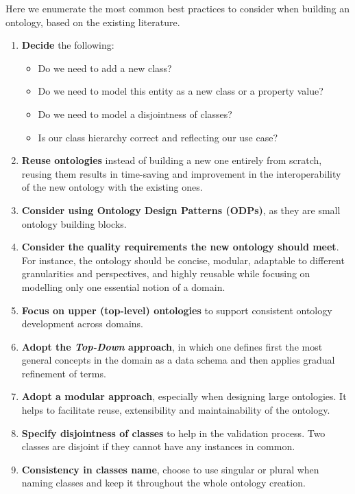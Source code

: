 \documentclass{guideline/sty/rapport}
\begin{document}
Here we enumerate the most common best practices to consider when building an ontology, based on the existing literature. \singlespacing

\begin{enumerate}
\item \textbf{Decide} the following:
    \begin{itemize}
        \item Do we need to add a new class? 
        \item Do we need to model this entity as a new class or a property value?
        \item Do we need to model a disjointness of classes? 
        \item Is our class hierarchy correct and reflecting our use case? \label{item:classhierarchy}
    \end{itemize}
    \item \textbf{Reuse ontologies} instead of building a new one entirely from scratch, reusing them results in time-saving and improvement in the interoperability of the new ontology with the existing ones. \label{item:reuse}
    \item \textbf{Consider using Ontology Design Patterns (\ac{ODPs})}, as they are small ontology building blocks. \label{item:useodp}
    \item \textbf{Consider the quality requirements the new ontology should meet}. For instance, the ontology should be concise, modular, adaptable to different granularities and perspectives, and highly reusable while focusing on modelling only one essential notion of a domain.
    \item \textbf{Focus on upper (top-level) ontologies} to support consistent ontology development across domains. \label{item:toplevel}
    \item \textbf{Adopt the \textit{Top-Down} approach}, in which one defines first the most general concepts in the domain as a data schema and then applies gradual refinement of terms. \label{item:topdown}
    \item \textbf{Adopt a modular approach}, especially when designing large ontologies. It helps to facilitate reuse, extensibility and maintainability of the ontology.
    \item \textbf{Specify disjointness of classes} to help in the validation process. Two classes are disjoint if they cannot have any instances in common.
    \item \textbf{Consistency in classes name}, choose to use singular or plural when naming classes and keep it throughout the whole ontology creation.

\end{enumerate}
\end{document}
